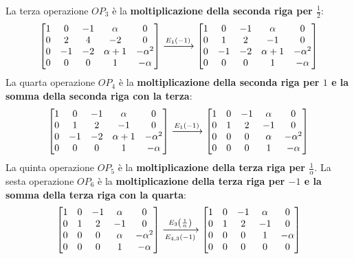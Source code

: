 \documentclass[a4paper]{article}
\makeatletter
\newenvironment{rowequmatbra}[1]{\left[\array{@{}#1@{}}}{\endarray\right]}
\makeatother
\begin{document}
	La terza operazione $OP_{3}$ è la \textbf{moltiplicazione della seconda riga per $\frac{1}{2}$}:
	\begin{equation*}
		\begin{rowequmatbra}{ccccc}
			1		& 0 	& -1		& \alpha		& 0				\\
			0		& 2 	& 4			& -2			& 0				\\
			0 		& -1	& -2		& \alpha+1		& -\alpha^{2}	\\
			0		& 0		& 0			& 1				& -\alpha
		\end{rowequmatbra} \xlongrightarrow{E_{1}\left(-1\right)}
		\begin{rowequmatbra}{ccccc}
			1		& 0 	& -1		& \alpha		& 0				\\
			0		& 1 	& 2			& -1			& 0				\\
			0 		& -1	& -2		& \alpha+1		& -\alpha^{2}	\\
			0		& 0		& 0			& 1				& -\alpha
		\end{rowequmatbra}
	\end{equation*}
	La quarta operazione $OP_{4}$ è la \textbf{moltiplicazione della seconda riga per $1$ e la somma della seconda riga con la terza}:
	\begin{equation*}
		\begin{rowequmatbra}{ccccc}
			1		& 0 	& -1		& \alpha		& 0				\\
			0		& 1 	& 2			& -1			& 0				\\
			0 		& -1	& -2		& \alpha+1		& -\alpha^{2}	\\
			0		& 0		& 0			& 1				& -\alpha
		\end{rowequmatbra} \xlongrightarrow{E_{1}\left(-1\right)}
		\begin{rowequmatbra}{ccccc}
			1		& 0 	& -1		& \alpha		& 0				\\
			0		& 1 	& 2			& -1			& 0				\\
			0 		& 0		& 0			& \alpha		& -\alpha^{2}	\\
			0		& 0		& 0			& 1				& -\alpha
		\end{rowequmatbra}
	\end{equation*}
	La quinta operazione $OP_{5}$ è la \textbf{moltiplicazione della terza riga per $\frac{1}{\alpha}$}. La sesta operazione $OP_{6}$ è la \textbf{moltiplicazione della terza riga per $-1$ e la somma della terza riga con la quarta}:
	\begin{equation*}
		\begin{rowequmatbra}{ccccc}
			1		& 0 	& -1		& \alpha		& 0				\\
			0		& 1 	& 2			& -1			& 0				\\
			0 		& 0		& 0			& \alpha		& -\alpha^{2}	\\
			0		& 0		& 0			& 1				& -\alpha
		\end{rowequmatbra} \xlongrightarrow[E_{4,3}\left(-1\right)]{E_{3}\left(\frac{1}{\alpha}\right)}
		\begin{rowequmatbra}{ccccc}
			1		& 0 	& -1		& \alpha		& 0				\\
			0		& 1 	& 2			& -1			& 0				\\
			0 		& 0		& 0			& 1				& -\alpha		\\
			0		& 0		& 0			& 0				& 0
		\end{rowequmatbra}
	\end{equation*}
\end{document}
